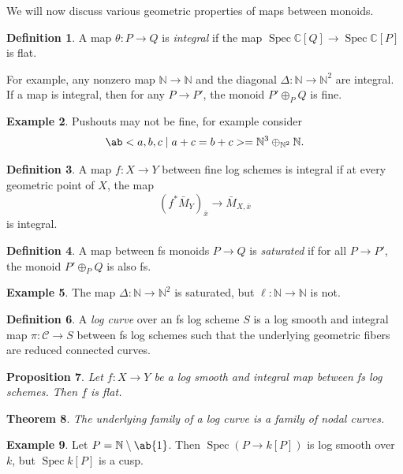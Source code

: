 \documentclass{amsart}
\newtheorem{thm}{Theorem}[section]
\newtheorem{prop}[thm]{Proposition}
\theoremstyle{definition}
\newtheorem{defn}[thm]{Definition}
\newtheorem{exm}[thm]{Example}
\theoremstyle{remark}
\theoremstyle{plain}
\theoremstyle{definition}
\theoremstyle{remark}
\newcommand{\N}{\mathbb{N}}
\newcommand{\C}{\mathbb{C}}
\newcommand{\mc}[1]{\mathcal{#1}}
\newcommand{\ul}[1]{\underline{#1}}
\newcommand{\1}{\mathbf{1}}
\newcommand{\2}{\mathbf{2}}
\newcommand{\3}{\mathbf{3}}
\DeclareMathOperator{\Spec}{Spec}
\begin{document}
We will now discuss various geometric properties of maps between monoids.
\begin{defn}
    A map \(\theta \colon P \to Q\) is \textit{integral} if the map \(\Spec\C[Q] \to \Spec \C[P]\) is flat.
\end{defn}

For example, any nonzero map \(\N \to \N\) and the diagonal \(\Delta \colon\N \to \N^2\) are integral. If a map is integral, then for any \(P \to P'\), the monoid \(P' \oplus_P Q\) is fine.

\begin{exm}
    Pushouts may not be fine, for example consider
    \[ \ab< a ,b,c \mid a+c=b+c> = \N^3 \oplus_{\N^2} \N. \]
\end{exm}

\begin{defn}
    A map \(f \colon X \to Y\) between fine log schemes is integral if at every geometric point of \(X\), the map
    \[ (f^*\bar{M}_Y)_{\bar{x}} \to \bar{M}_{X,\bar{x}} \]
    is integral.
\end{defn}

\begin{defn}
    A map between fs monoids \(P \to Q\) is \textit{saturated} if for all \(P \to P'\), the monoid \(P' \oplus_P Q\) is also fs.
\end{defn}

\begin{exm}
    The map \(\Delta \colon \N \to \N^2\) is saturated, but \(\ell \colon \N \to \N\) is not.
\end{exm}

\begin{defn}
    A \textit{log curve} over an fs log scheme \(S\) is a log smooth and integral map \(\pi \colon \mc{C} \to S\) between fs log schemes such that the underlying geometric fibers are reduced connected curves.
\end{defn}

\begin{prop}
    Let \(f \colon X \to Y\) be a log smooth and integral map between fs log schemes. Then \(\ul{f}\) is flat.
\end{prop}

\begin{thm}
    The underlying family of a log curve is a family of nodal curves.
\end{thm}

\begin{exm}
    Let \(P = \N \setminus \ab\{1\}\). Then \(\Spec (P \to k[P])\) is log smooth over \(k\), but \(\Spec k[P]\) is a cusp.
\end{exm}
\end{document}

